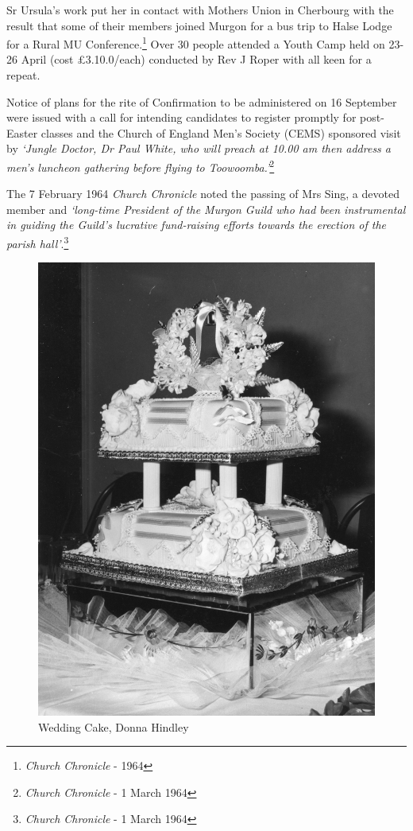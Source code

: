 Sr Ursula's work put her in contact with Mothers Union in Cherbourg with the result that some of their members joined Murgon for a bus trip to Halse Lodge for a Rural MU Conference.\footnote{\emph{Church Chronicle} - 1964} Over 30 people attended a Youth Camp held on 23-26 April (cost \pounds3.10.0/each) conducted by Rev J Roper with all keen for a repeat.


Notice of plans for the rite of Confirmation to be administered on 16 September were issued with a call for intending candidates to register promptly for post-Easter classes and the Church of England Men's Society (CEMS) sponsored visit by \emph{`Jungle Doctor, Dr Paul White, who will preach at 10.00 am then address a men's luncheon gathering before flying to Toowoomba.'}\footnote{\emph{Church Chronicle} - 1 March 1964}


The 7 February 1964 \emph{Church Chronicle} noted the passing of Mrs Sing, a devoted member and \emph{`long-time President of the Murgon Guild who had been instrumental in guiding the Guild's lucrative fund-raising efforts towards the erection of the parish hall'}.\footnote{\emph{Church Chronicle} - 1 March 1964}








\begin{figure}
\begin{center}
\includegraphics[width=.5\linewidth,center]{../images/donnaWeddingCake.jpg}
\caption{Wedding Cake, Donna Hindley}
\end{center}
\end{figure}




